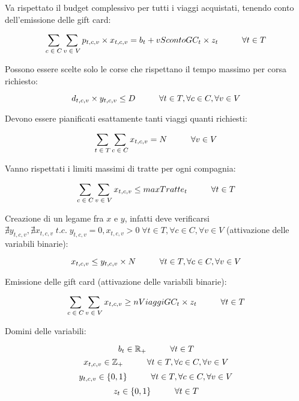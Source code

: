 \documentclass[main.tex]{subfiles}
\begin{document}
Va rispettato il budget complessivo per tutti i viaggi acquistati, tenendo conto dell'emissione delle gift card:
\begin{tcolorbox}
$$\sum_{c\; \in\; C} \sum_{v\; \in\; V} p_{t,c,v} \times{} x_{t,c,v} = b_t + vScontoGC_t \times{} z_t \hspace{10mm} \forall{} t \in T$$
\end{tcolorbox}

Possono essere scelte solo le corse che rispettano il tempo massimo per corsa richiesto:
\begin{tcolorbox}
$$d_{t,c,v} \times{} y_{t,c,v} \leq D \hspace{10mm} \forall{} t \in T, \forall{} c \in C, \forall{} v \in V$$
\end{tcolorbox}

Devono essere pianificati esattamente tanti viaggi quanti richiesti:
\begin{tcolorbox}
$$\sum_{t\; \in\; T} \sum_{c\; \in\; C} x_{t,c,v} = N \hspace{10mm} \forall{} v \in V$$
\end{tcolorbox}

Vanno rispettati i limiti massimi di tratte per ogni compagnia:
\begin{tcolorbox}
$$\sum_{c\; \in\; C} \sum_{v\; \in\; V} x_{t,c,v} \leq maxTratte_t \hspace{10mm} \forall{} t \in T$$
\end{tcolorbox}

Creazione di un legame fra $x$ e $y$, infatti deve verificarsi $\nexists y_{t,c,v}, \nexists x_{t,c,v}\; t.c.\; y_{t,c,v} = 0, x_{t,c,v} > 0\; \forall{} t \in T, \forall{} c \in C, \forall{} v \in V$ (attivazione delle variabili binarie):
\begin{tcolorbox}
$$x_{t,c,v} \leq y_{t,c,v} \times{} N \hspace{10mm} \forall{} t \in T, \forall{} c \in C, \forall{} v \in V$$
\end{tcolorbox}

Emissione delle gift card (attivazione delle variabili binarie):
\begin{tcolorbox}
$$\sum_{c\; \in\; C} \sum_{v\; \in\; V} x_{t,c,v} \geq nViaggiGC_t \times z_t \hspace{10mm} \forall{} t \in T$$
\end{tcolorbox}

Domini delle variabili:
\begin{tcolorbox}
$$b_t \in \mathbb{R}_+ \hspace{10mm} \forall{} t \in T$$
$$x_{t,c,v} \in \mathbb{Z}_+ \hspace{10mm} \forall{} t \in T, \forall{} c \in C, \forall{} v \in V$$
$$y_{t,c,v} \in \{0,1\} \hspace{10mm} \forall{} t \in T, \forall{} c \in C, \forall{} v \in V$$
$$z_t \in \{0,1\} \hspace{10mm} \forall{} t \in T$$
\end{tcolorbox}
\end{document}
